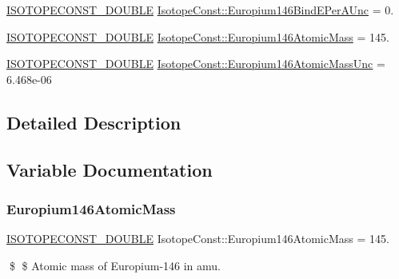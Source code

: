 \begin{DoxyCompactItemize}
\mbox{\hyperlink{group___isotope_const-_macros_ga8f45a7272ce02c0b4c65c44636ed719a}{I\+S\+O\+T\+O\+P\+E\+C\+O\+N\+S\+T\+\_\+\+D\+O\+U\+B\+LE}} \mbox{\hyperlink{group___isotope_const-_europium-_eu146_gaea302763b6c5a2e46e8bfc750160074f}{Isotope\+Const\+::\+Europium146\+Bind\+E\+Per\+A\+Unc}} = 0.
\item 
\mbox{\hyperlink{group___isotope_const-_macros_ga8f45a7272ce02c0b4c65c44636ed719a}{I\+S\+O\+T\+O\+P\+E\+C\+O\+N\+S\+T\+\_\+\+D\+O\+U\+B\+LE}} \mbox{\hyperlink{group___isotope_const-_europium-_eu146_ga9164c0c636a240833ce291a4a79b873f}{Isotope\+Const\+::\+Europium146\+Atomic\+Mass}} = 145.
\item 
\mbox{\hyperlink{group___isotope_const-_macros_ga8f45a7272ce02c0b4c65c44636ed719a}{I\+S\+O\+T\+O\+P\+E\+C\+O\+N\+S\+T\+\_\+\+D\+O\+U\+B\+LE}} \mbox{\hyperlink{group___isotope_const-_europium-_eu146_gaf4139fb467b2adb777209aade7fd3e2f}{Isotope\+Const\+::\+Europium146\+Atomic\+Mass\+Unc}} = 6.\+468e-\/06
\end{DoxyCompactItemize}


\subsection{Detailed Description}


\subsection{Variable Documentation}
\mbox{\label{group___isotope_const-_europium-_eu146_ga9164c0c636a240833ce291a4a79b873f}} 
\subsubsection{\texorpdfstring{Europium146\+Atomic\+Mass}{Europium146AtomicMass}}
{\footnotesize\ttfamily \mbox{\hyperlink{group___isotope_const-_macros_ga8f45a7272ce02c0b4c65c44636ed719a}{I\+S\+O\+T\+O\+P\+E\+C\+O\+N\+S\+T\+\_\+\+D\+O\+U\+B\+LE}} Isotope\+Const\+::\+Europium146\+Atomic\+Mass = 145.}

\$ \$ Atomic mass of Europium-\/146 in amu. \mbox{\label{group___isotope_const-_europium-_eu146_gaf4139fb467b2adb777209aade7fd3e2f}} 
